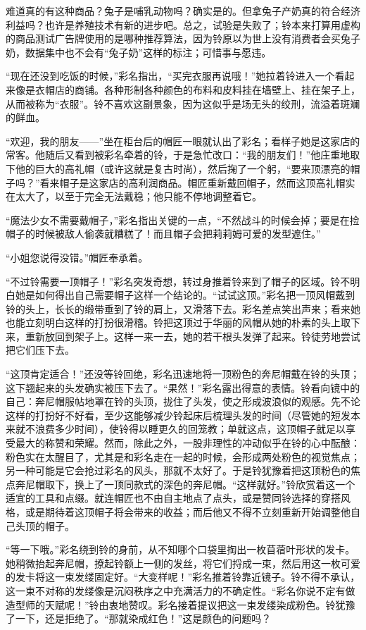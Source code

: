 难道真的有这种商品？兔子是哺乳动物吗？确实是的。但拿兔子产奶真的符合经济利益吗？也许是养殖技术有新的进步吧。总之，试验是失败了；铃本来打算用虚构的商品测试广告牌使用的是哪种推荐算法，因为铃原以为世上没有消费者会买兔子奶，数据集中也不会有“兔子奶”这样的标注；可惜事与愿违。

“现在还没到吃饭的时候，”彩名指出，“买完衣服再说哦！”她拉着铃进入一个看起来像是衣帽店的商铺。各种形制各种颜色的布料和皮料挂在墙壁上、挂在架子上，从而被称为“衣服”。铃不喜欢这副景象，因为这似乎是场无头的绞刑，流溢着斑斓的鲜血。

“欢迎，我的朋友——”坐在柜台后的帽匠一眼就认出了彩名；看样子她是这家店的常客。他随后又看到被彩名牵着的铃，于是急忙改口：“我的朋友们！”他庄重地取下他的巨大的高礼帽（或许这就是复古时尚），然后掬了一个躬，“要来顶漂亮的帽子吗？”看来帽子是这家店的高利润商品。帽匠重新戴回帽子，然而这顶高礼帽实在太大了，以至于完全无法戴稳；他只能不停地调整着它。

“魔法少女不需要戴帽子，”彩名指出关键的一点，“不然战斗的时候会掉；要是在捡帽子的时候被敌人偷袭就糟糕了！而且帽子会把莉莉姆可爱的发型遮住。”

“小姐您说得没错。”帽匠奉承着。

“不过铃需要一顶帽子！”彩名突发奇想，转过身推着铃来到了帽子的区域。铃不明白她是如何得出自己需要帽子这样一个结论的。“试试这顶。”彩名把一顶风帽戴到铃的头上，长长的缎带垂到了铃的肩上，又滑落下去。彩名差点笑出声来；看来她也能立刻明白这样的打扮很滑稽。铃把这顶过于华丽的风帽从她的朴素的头上取下来，重新放回到架子上。这样一来一去，她的若干根头发弹了起来。铃徒劳地尝试把它们压下去。

“这顶肯定适合！”还没等铃回绝，彩名迅速地将一顶粉色的奔尼帽戴在铃的头顶；这下翘起来的头发确实被压下去了。“果然！”彩名露出得意的表情。铃看向镜中的自己：奔尼帽服帖地罩在铃的头顶，拢住了头发，使之形成波浪似的观感。先不论这样的打扮好不好看，至少这能够减少铃起床后梳理头发的时间（尽管她的短发本来就不浪费多少时间），使铃得以睡更久的回笼教；单就这点，这顶帽子就足以享受最大的称赞和荣耀。然而，除此之外，一股非理性的冲动似乎在铃的心中酝酿：粉色实在太醒目了，尤其是和彩名走在一起的时候，会形成两处粉色的视觉焦点；另一种可能是它会抢过彩名的风头，那就不太好了。于是铃犹豫着把这顶粉色的焦点奔尼帽取下，换上了一顶同款式的深色的奔尼帽。“这样就好。”铃欣赏着这一个适宜的工具和点缀。就连帽匠也不由自主地点了点头，或是赞同铃选择的穿搭风格，或是期待着这顶帽子将会带来的收益；而后他又不得不立刻重新开始调整他自己头顶的帽子。

“等一下哦。”彩名绕到铃的身前，从不知哪个口袋里掏出一枚苜蓿叶形状的发卡。她稍微抬起奔尼帽，撩起铃额上一侧的发丝，将它们捋成一束，然后用这一枚可爱的发卡将这一束发缕固定好。“大变样呢！”彩名推着铃靠近镜子。铃不得不承认，这一束不对称的发缕像是沉闷秩序之中充满活力的不确定性。“彩名你说不定有做造型师的天赋呢！”铃由衷地赞叹。彩名接着提议把这一束发缕染成粉色。铃犹豫了一下，还是拒绝了。“那就染成红色！”这是颜色的问题吗？

